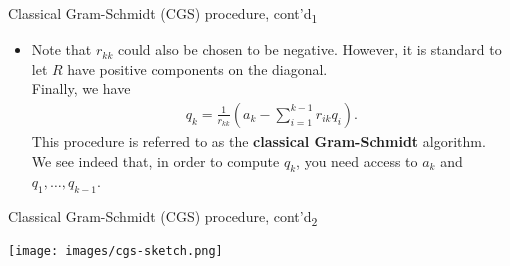\documentclass[t,usepdftitle=false]{beamer}
\begin{document}
\begin{frame}{Classical Gram-Schmidt (CGS) procedure, cont'd\textsubscript{1}}
\begin{itemize}
\item[]
Note that $r_{kk}$ could also be chosen to be negative. 
However, it is standard to let $R$ have positive components on the diagonal.\vspace{.1cm}\\
Finally, we have
\begin{align*}
q_k=\frac{1}{r_{kk}}\left(a_k-\sum_{i=1}^{k-1}r_{ik}q_i\right).
\end{align*}
This procedure is referred to as the \textbf{classical Gram-Schmidt} algorithm.\vspace{.1cm}\\
We see indeed that, in order to compute $q_k$, you need access to $a_k$ and $q_1,\dots,q_{k-1}$.
\end{itemize}
\end{frame}

\begin{frame}{Classical Gram-Schmidt (CGS) procedure, cont'd\textsubscript{2}}
\begin{center}
\texttt{[image: images/cgs-sketch.png]}
\end{center}
\end{frame}
\end{document}
